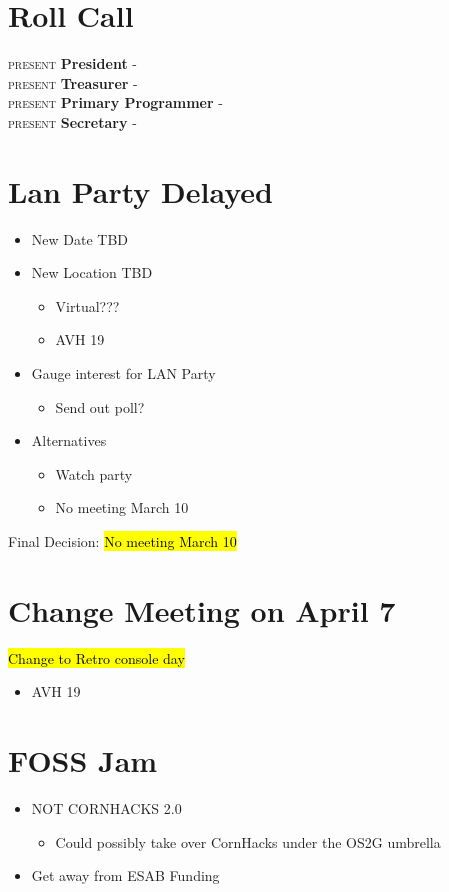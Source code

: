 \section*{Roll Call}

\noindent \textsc{present} \textbf{President} - \president \\
\textsc{present} \textbf{Treasurer} - \treasurer \\
\textsc{present} \textbf{Primary Programmer} - \primaryprogrammer \\
\textsc{present} \textbf{Secretary} - \secretary \\

\section*{Lan Party Delayed}
   \begin{itemize}
       \item New Date TBD
       \item New Location TBD
       \begin{itemize}
           \item Virtual???
           \item AVH 19
       \end{itemize}
       \item Gauge interest for LAN Party
       \begin{itemize}
           \item Send out poll?
       \end{itemize}
       \item Alternatives
       \begin{itemize}
           \item Watch party
           \item No meeting March 10
       \end{itemize}
   \end{itemize}
Final Decision: \hl{No meeting March 10}

\section*{Change Meeting on April 7}
\hl{Change to Retro console day}
   \begin{itemize}
       \item AVH 19
   \end{itemize}

\section*{FOSS Jam}
   \begin{itemize}
       \item NOT CORNHACKS 2.0
       \begin{itemize}
            \item Could possibly take over CornHacks under the OS2G umbrella
        \end{itemize}
       \item Get away from ESAB Funding
   \end{itemize}

